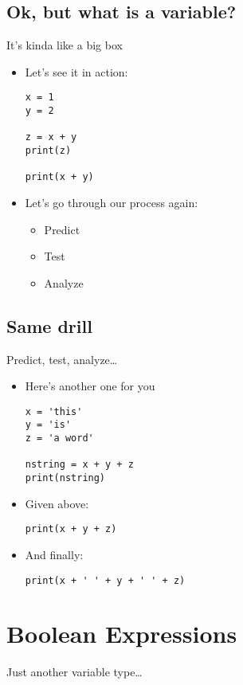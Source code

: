 \documentclass[11pt]{article}
\begin{document}
\subsection{Ok, but what is a variable?}
\label{sec:org22cbcb9}
It's kinda like a big box

\begin{itemize}
\item Let's see it in action:
\begin{verbatim}
x = 1
y = 2

z = x + y
print(z)

print(x + y)
\end{verbatim}

\item Let's go through our process again:
\begin{itemize}
\item Predict
\item Test
\item Analyze
\end{itemize}
\end{itemize}
\subsection{Same drill}
\label{sec:org5899cf1}
Predict, test, analyze\ldots{}

\begin{itemize}
\item Here's another one for you
\begin{verbatim}
x = 'this'
y = 'is'
z = 'a word'

nstring = x + y + z
print(nstring)
\end{verbatim}

\item Given above:
\begin{verbatim}
print(x + y + z)
\end{verbatim}

\item And finally:
\begin{verbatim}
print(x + ' ' + y + ' ' + z)
\end{verbatim}
\end{itemize}

\section{Boolean Expressions}
\label{sec:orgc3bcb9a}
Just another variable type\ldots{}
\end{document}
